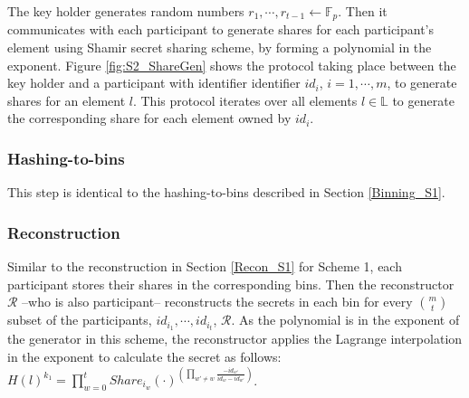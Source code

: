 The key holder generates random numbers $r_1, \cdots, r_{t-1} \gets \mathbb{F}_p$. Then it communicates with each participant to generate shares for each participant's element using Shamir secret sharing scheme, by forming a polynomial in the exponent. Figure \ref{fig:S2_ShareGen} shows the protocol taking place between the key holder and a participant with identifier identifier $id_i$, $i =1, \cdots, m$, to generate shares for an element $l$. This protocol iterates over all elements $l \in \mathbb{L}$ to generate the corresponding share for each element owned by $id_i$.

\subsubsection{Hashing-to-bins}\label{Binning_S2} This step is identical to the hashing-to-bins described in Section \ref{Binning_S1}.

\subsubsection{Reconstruction}\label{Recon_S2}
Similar to the reconstruction in Section \ref{Recon_S1} for Scheme 1, each participant stores their shares in the corresponding bins. Then the reconstructor $\mathcal{R}$ --who is also participant-- reconstructs the secrets in each bin for every $m \choose t$ subset of the participants, $id_{i_1}, \cdots, id_{i_t}$, $\mathcal{R}$. As the polynomial is in the exponent of the generator in this scheme, the reconstructor applies the Lagrange interpolation in the exponent to calculate the secret as follows: $H(l)^{k_1} = \prod^t_{w=0} Share_{i_w}(\cdot)^{(\prod_{w' \neq w} \frac{-id_{w'}}{id_w - id_{w'}})}$.

